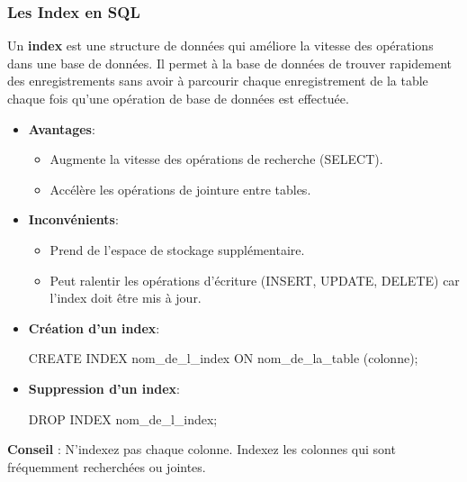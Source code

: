 \begin{frame}
  \frametitle{Les Index en SQL}

  Un \textbf{index} est une structure de données qui améliore la vitesse des opérations dans une base de données. Il permet à la base de données de trouver rapidement des enregistrements sans avoir à parcourir chaque enregistrement de la table chaque fois qu'une opération de base de données est effectuée.

  \begin{itemize}
    \item \textbf{Avantages}:
      \begin{itemize}
        \item Augmente la vitesse des opérations de recherche (SELECT).
        \item Accélère les opérations de jointure entre tables.
      \end{itemize}
    \item \textbf{Inconvénients}:
      \begin{itemize}
        \item Prend de l'espace de stockage supplémentaire.
        \item Peut ralentir les opérations d'écriture (INSERT, UPDATE, DELETE) car l'index doit être mis à jour.
      \end{itemize}
    \item \textbf{Création d'un index}:
      \begin{semiverbatim}
CREATE INDEX nom\_de\_l\_index
ON nom\_de\_la\_table (colonne);
      \end{semiverbatim}
    \item \textbf{Suppression d'un index}:
      \begin{semiverbatim}
DROP INDEX nom\_de\_l\_index;
      \end{semiverbatim}
  \end{itemize}

  \textbf{Conseil} : N'indexez pas chaque colonne. Indexez les colonnes qui sont fréquemment recherchées ou jointes.

\end{frame}

